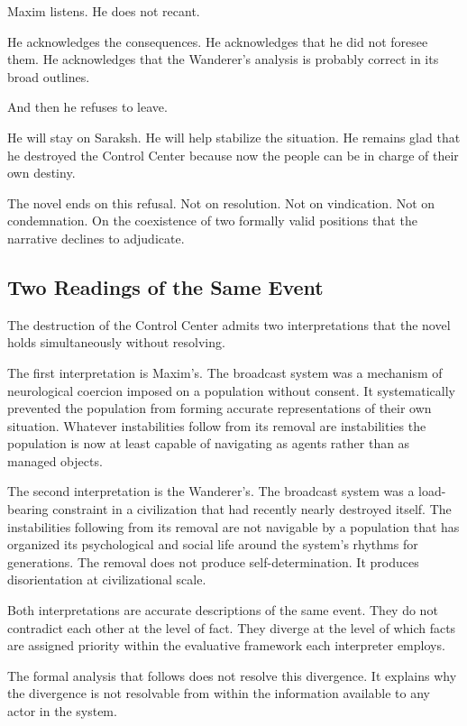 \documentclass[12pt, a4paper]{article}
\theoremstyle{plain}
\theoremstyle{definition}
\theoremstyle{remark}
\begin{document}
Maxim listens. He does not recant.

He acknowledges the consequences. He acknowledges
that he did not foresee them. He acknowledges
that the Wanderer's analysis is probably correct
in its broad outlines.

And then he refuses to leave.

He will stay on Saraksh. He will help stabilize
the situation. He remains glad that he destroyed
the Control Center because now the people can
be in charge of their own destiny.

The novel ends on this refusal. Not on resolution.
Not on vindication. Not on condemnation. On the
coexistence of two formally valid positions that
the narrative declines to adjudicate.

\subsection{Two Readings of the Same Event}

The destruction of the Control Center admits two
interpretations that the novel holds simultaneously
without resolving.

The first interpretation is Maxim's. The broadcast
system was a mechanism of neurological coercion
imposed on a population without consent. It
systematically prevented the population from
forming accurate representations of their own
situation. Whatever instabilities follow from its
removal are instabilities the population is now
at least capable of navigating as agents rather
than as managed objects.

The second interpretation is the Wanderer's. The
broadcast system was a load-bearing constraint in
a civilization that had recently nearly destroyed
itself. The instabilities following from its
removal are not navigable by a population that
has organized its psychological and social life
around the system's rhythms for generations. The
removal does not produce self-determination. It
produces disorientation at civilizational scale.

Both interpretations are accurate descriptions
of the same event. They do not contradict each
other at the level of fact. They diverge at the
level of which facts are assigned priority within
the evaluative framework each interpreter employs.

The formal analysis that follows does not resolve
this divergence. It explains why the divergence
is not resolvable from within the information
available to any actor in the system.
\end{document}
